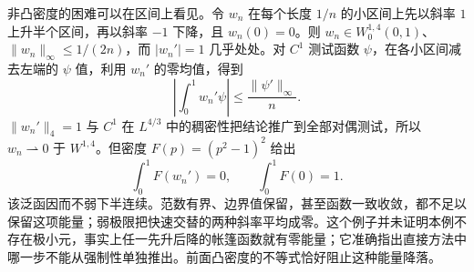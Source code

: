 非凸密度的困难可以在区间上看见。令 \(w_n\) 在每个长度 \(1/n\) 的小区间上先以斜率 \(1\) 上升半个区间，再以斜率 \(-1\) 下降，且 \(w_n(0)=0\)。则 \(w_n\in W_0^{1,4}(0,1)\)、\(\|w_n\|_\infty\le1/(2n)\)，而 \(|w_n'|=1\) 几乎处处。对 \(C^1\) 测试函数 \(\psi\)，在各小区间减去左端的 \(\psi\) 值，利用 \(w_n'\) 的零均值，得到
\[\left|\int_0^1w_n'\psi\right|\le\frac{\|\psi'\|_\infty}{n}.\]
\(\|w_n'\|_4=1\) 与 \(C^1\) 在 \(L^{4/3}\) 中的稠密性把结论推广到全部对偶测试，所以 \(w_n\rightharpoonup0\) 于 \(W^{1,4}\)。但密度 \(F(p)=(p^2-1)^2\) 给出
\[\int_0^1F(w_n')=0,\qquad \int_0^1F(0)=1.\]
该泛函因而不弱下半连续。范数有界、边界值保留，甚至函数一致收敛，都不足以保留这项能量；弱极限把快速交替的两种斜率平均成零。这个例子并未证明本例不存在极小元，事实上任一先升后降的帐篷函数就有零能量；它准确指出直接方法中哪一步不能从强制性单独推出。前面凸密度的不等式恰好阻止这种能量降落。
